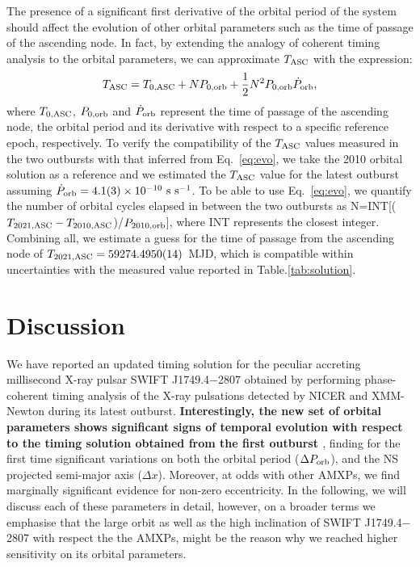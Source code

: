 \documentclass[fleqn,usenatbib]{mnras}
\newcommand{\swiftj}{SWIFT J1749.4$-$2807}
\newcommand{\nicer}{NICER}
\newcommand{\xmm}{XMM-Newton}
\begin{document}
The presence of a significant first derivative of the orbital period of the system should affect the evolution of other orbital parameters such as the time of passage of the ascending node. In fact, by extending the analogy of coherent timing analysis to the orbital parameters, we can approximate $T_{\rm ASC}$ with the expression:
\begin{equation}
\label{eq:evo}
T_{\rm ASC}=T_{0,{\rm ASC}}+N P_{0,{\rm orb}}+\frac{1}{2}N^2P_{0,{\rm orb}}\dot{P}_{\rm orb},
\end{equation}
where $T_{0,{\rm ASC}}$, $P_{0,{\rm orb}}$ and $\dot{P}_{\rm orb}$ represent the time of passage of	the ascending node, the orbital period and its derivative with respect to a specific reference epoch, respectively. 
To verify the compatibility of the $T_{\rm ASC}$ values measured in the two outbursts with that inferred from Eq.~\ref{eq:evo}, we take the 2010 orbital solution as a reference and we estimated the $T_{\rm ASC}$ value for the latest outburst assuming $\dot{P}_{\rm orb}=4.1(3)\times 10^{-10}~\text{s}~\text{s}^{-1}$. To be able to use Eq.~\ref{eq:evo}, we quantify the number of orbital cycles elapsed in between the two outbursts as N=INT[($T_{2021,{\rm ASC}}-T_{2010,{\rm ASC}}$)/$P_{2010,{\rm orb}}$], where INT represents the closest integer. Combining all, we estimate a guess for the time of passage from the ascending node of $T_{2021,{\rm ASC}}=59274.4950(14)$~MJD, which is compatible within uncertainties with the measured value reported in Table.\ref{tab:solution}.



\section{Discussion}

We have reported an updated timing solution for the peculiar accreting millisecond X-ray pulsar \swiftj{} obtained by performing phase-coherent timing analysis of the X-ray pulsations detected by \nicer{} and \xmm{} during its latest outburst. \textbf{Interestingly, the new set of orbital parameters shows significant signs of temporal evolution with respect to the timing solution obtained from the first outburst \citep[see also][]{Markwardt:2010tl,Altamirano:2011uq,Ferrigno:2011wz}}, finding for the first time significant variations on both the orbital period ($\Delta P_{\rm orb}$), and the NS projected semi-major axis ($\Delta x$). Moreover, at odds with other AMXPs, we find marginally significant evidence for non-zero eccentricity. In the following, we will discuss each of these parameters in detail, however, on a broader terms we emphasise that the large orbit as well as the high inclination of \swiftj{} with respect the the AMXPs, might be the reason why we reached higher sensitivity on its orbital parameters.  
\end{document}

